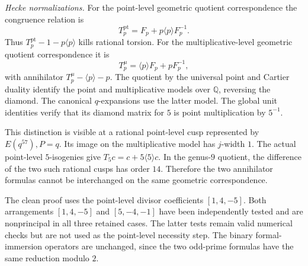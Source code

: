 \noindent\emph{Hecke normalizations.}
For the point-level geometric quotient correspondence the congruence relation is
\[
 T_p^{\mathrm{pt}}=F_p+p\langle p\rangle F_p^{-1}.
\]
Thus $T_p^{\mathrm{pt}}-1-p\langle p\rangle$ kills rational torsion.
For the multiplicative-level geometric quotient correspondence it is
\[
 T_p^{\mu}=\langle p\rangle F_p+pF_p^{-1},
\]
with annihilator $T_p^\mu-\langle p\rangle-p$.
The quotient by the universal point and Cartier duality identify the point
and multiplicative models over $\mathbb Q$, reversing the diamond.
The canonical $q$-expansions use the latter model. The global unit
identities verify that its diamond matrix for $5$ is point multiplication
by $5^{-1}$.

This distinction is visible at a rational point-level cusp represented by
$E(q^{57}),P=q$. Its image on the multiplicative model has $j$-width $1$.
The actual point-level $5$-isogenies give $T_5c=c+5\langle5\rangle c$.
In the genus-$9$ quotient, the difference of the two such rational cusps
has order $14$. Therefore the two annihilator formulas cannot be
interchanged on the same geometric correspondence.

The clean proof uses the point-level divisor coefficients $[1,4,-5]$.
Both arrangements $[1,4,-5]$ and $[5,-4,-1]$ have been independently tested
and are nonprincipal in all three retained cases. The latter tests remain
valid numerical checks but are not used as the point-level necessity step.
The binary formal-immersion operators are unchanged, since the two odd-prime
formulas have the same reduction modulo $2$.
